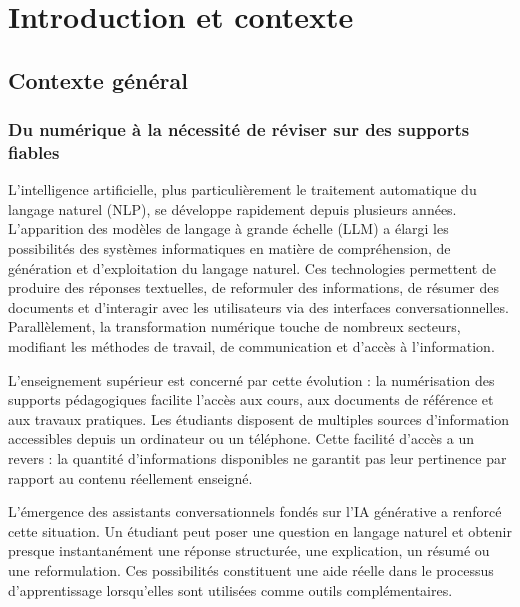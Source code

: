 \documentclass[12pt,a4paper,oneside]{report}
\begin{document}
\clearpage
{}

\chapter{Introduction et contexte}

\section{Contexte général}

\subsection*{Du numérique à la nécessité de réviser sur des supports fiables}

L'intelligence artificielle, plus particulièrement le traitement automatique du langage naturel (NLP), se développe rapidement depuis plusieurs années. L'apparition des modèles de langage à grande échelle (LLM) a élargi les possibilités des systèmes informatiques en matière de compréhension, de génération et d'exploitation du langage naturel. Ces technologies permettent de produire des réponses textuelles, de reformuler des informations, de résumer des documents et d'interagir avec les utilisateurs via des interfaces conversationnelles. Parallèlement, la transformation numérique touche de nombreux secteurs, modifiant les méthodes de travail, de communication et d'accès à l'information.

L'enseignement supérieur est concerné par cette évolution : la numérisation des supports pédagogiques facilite l'accès aux cours, aux documents de référence et aux travaux pratiques. Les étudiants disposent de multiples sources d'information accessibles depuis un ordinateur ou un téléphone. Cette facilité d'accès a un revers : la quantité d'informations disponibles ne garantit pas leur pertinence par rapport au contenu réellement enseigné.

L'émergence des assistants conversationnels fondés sur l'IA générative a renforcé cette situation. Un étudiant peut poser une question en langage naturel et obtenir presque instantanément une réponse structurée, une explication, un résumé ou une reformulation. Ces possibilités constituent une aide réelle dans le processus d'apprentissage lorsqu'elles sont utilisées comme outils complémentaires.
\end{document}
